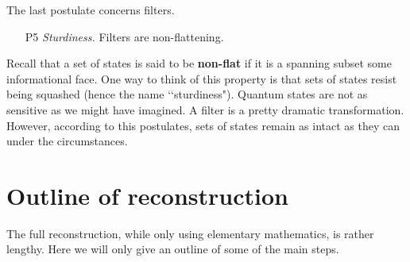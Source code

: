 \documentclass[10pt]{article}
\begin{document}
The last postulate concerns filters.
\begin{itemize}
\item[P5] \emph{Sturdiness.} Filters are non-flattening.
\end{itemize}
Recall that a set of states is said to be {\bf non-flat} if it is a spanning subset some informational face.  One way to think of this property is that sets of states resist being squashed (hence the name \lq\lq sturdiness").  Quantum states are not as sensitive as we might have imagined.  A filter is a pretty dramatic transformation. However, according to this postulates, sets of states remain as intact as they can under the circumstances.


\section{Outline of reconstruction}

The full reconstruction, while only using elementary mathematics, is rather lengthy.  Here we will only give an outline of some of the main steps.
\end{document}
